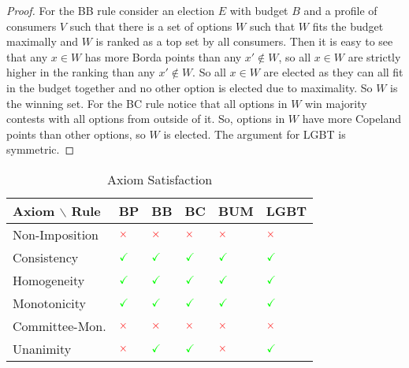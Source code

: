 \documentclass{article}
\begin{document}
\begin{proof}

\item For the BB rule consider an election $E$ with budget $B$ and a profile of consumers $V$ such that there is a set of options $W$ such that $W$ fits the budget maximally and $W$ is ranked as a top set by all consumers. Then it is easy to see that any $x \in W$ has more Borda points than any $x' \notin W$, so all $x \in W$ are strictly higher in the ranking than any $x' \notin W$. So all $x \in W$ are elected as they can all fit in the budget together and no other option is elected due to maximality. So $W$ is the winning set. For the BC rule notice that all options in $W$ win majority contests with all options from outside of it. So, options in $W$ have more Copeland points than other options, so $W$ is elected. The argument for LGBT is symmetric.


\end{proof}

\begin{table}[h!]
		\centering
		\caption{Axiom Satisfaction}
		\label{my-label}
		\begin{tabular}{|l|l|l|l|l|l|}
			\hline
			Axiom $\backslash$ Rule  & BP       & BB       & BC        & BUM       & LGBT \\ \hline
			Non-Imposition         & $\textcolor{red}{\times}$ & $\textcolor{red}{\times}$ & $\textcolor{red}{\times}$  & $\textcolor{red}{\times}$  & $\textcolor{red}{\times}$ \\ \hline
			Consistency            & $\textcolor{green}{\checkmark}$        & $\textcolor{green}{\checkmark}$        & $\textcolor{green}{\checkmark}$         & $\textcolor{green}{\checkmark}$         & $\textcolor{green}{\checkmark}$         \\ \hline
			Homogeneity        & $\textcolor{green}{\checkmark}$ & $\textcolor{green}{\checkmark}$ & $\textcolor{green}{\checkmark}$   & $\textcolor{green}{\checkmark}$ & $\textcolor{green}{\checkmark}$ \\ \hline
			Monotonicity     & $\textcolor{green}{\checkmark}$  & $\textcolor{green}{\checkmark}$  & $\textcolor{green}{\checkmark}$ & $\textcolor{green}{\checkmark}$   & $\textcolor{green}{\checkmark}$ \\ \hline
			Committee-Mon. & $\textcolor{red}{\times}$ & $\textcolor{red}{\times}$      & $\textcolor{red}{\times}$    & $\textcolor{red}{\times}$     & $\textcolor{red}{\times}$  \\ \hline
			Unanimity              & $\textcolor{red}{\times}$  & $\textcolor{green}{\checkmark}$  & $\textcolor{green}{\checkmark}$ & $\textcolor{red}{\times}$      & $\textcolor{green}{\checkmark}$ \\ \hline
		\end{tabular}
	\end{table}
\end{document}
